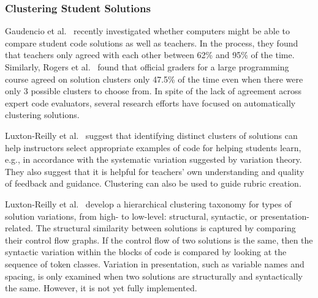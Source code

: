 

\subsubsection{Clustering Student Solutions}


Gaudencio et al.~\cite{Gaudencio} recently investigated whether computers might be able to compare student code solutions as well as teachers. In the process, they found that teachers only agreed with each other between 62\% and 95\% of the time. Similarly, Rogers et al.~\cite{ACESthesis} found that official graders for a large programming course agreed on solution clusters only 47.5\% of the time even when there were only 3 possible clusters to choose from. In spite of the lack of agreement across expert code evaluators, several research efforts have focused on automatically clustering solutions.

Luxton-Reilly et al.~\cite{Luxton13} suggest that identifying distinct clusters of solutions can help instructors select appropriate examples of code for helping students learn, e.g., in accordance with the systematic variation suggested by variation theory. They also suggest that it is helpful for teachers' own understanding and quality of feedback and guidance. Clustering can also be used to guide rubric creation.

Luxton-Reilly et al.~\cite{Luxton13} develop a hierarchical clustering taxonomy for types of solution variations, from high- to low-level: structural, syntactic, or presentation-related. The structural similarity between solutions is captured by comparing their control flow graphs. If the control flow of two solutions is the same, then the syntactic variation within the blocks of code is compared by looking at the sequence of token classes. Variation in presentation, such as variable names and spacing, is only examined when two solutions are structurally and syntactically the same. However, it is not yet fully implemented. %


